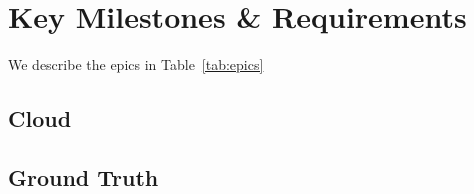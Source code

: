 \chapter{Key Milestones \& Requirements}\label{ch:key-milestones-&-requirements}

We describe the epics in Table~\ref{tab:epics}


\section{Cloud}\label{sec:cloud}



\section{Ground Truth}\label{sec:ground-truth}
